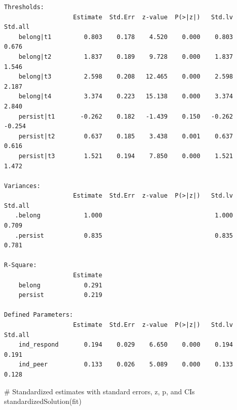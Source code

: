 \documentclass[
  letterpaper,
  DIV=11,
  numbers=noendperiod]{scrartcl}
\newenvironment{Shaded}{\begin{snugshade}}{\end{snugshade}}
\newcommand{\CommentTok}[1]{\textcolor[rgb]{0.37,0.37,0.37}{#1}}
\newcommand{\FunctionTok}[1]{\textcolor[rgb]{0.28,0.35,0.67}{#1}}
\newcommand{\NormalTok}[1]{\textcolor[rgb]{0.00,0.23,0.31}{#1}}
\begin{document}
\begin{verbatim}
Thresholds:
                   Estimate  Std.Err  z-value  P(>|z|)   Std.lv  Std.all
    belong|t1         0.803    0.178    4.520    0.000    0.803    0.676
    belong|t2         1.837    0.189    9.728    0.000    1.837    1.546
    belong|t3         2.598    0.208   12.465    0.000    2.598    2.187
    belong|t4         3.374    0.223   15.138    0.000    3.374    2.840
    persist|t1       -0.262    0.182   -1.439    0.150   -0.262   -0.254
    persist|t2        0.637    0.185    3.438    0.001    0.637    0.616
    persist|t3        1.521    0.194    7.850    0.000    1.521    1.472

Variances:
                   Estimate  Std.Err  z-value  P(>|z|)   Std.lv  Std.all
   .belong            1.000                               1.000    0.709
   .persist           0.835                               0.835    0.781

R-Square:
                   Estimate
    belong            0.291
    persist           0.219

Defined Parameters:
                   Estimate  Std.Err  z-value  P(>|z|)   Std.lv  Std.all
    ind_respond       0.194    0.029    6.650    0.000    0.194    0.191
    ind_peer          0.133    0.026    5.089    0.000    0.133    0.128
\end{verbatim}

\begin{Shaded}
\begin{Highlighting}[]
\CommentTok{\# Standardized estimates with standard errors, z, p, and CIs}
\FunctionTok{standardizedSolution}\NormalTok{(fit)}
\end{Highlighting}
\end{Shaded}
\end{document}
